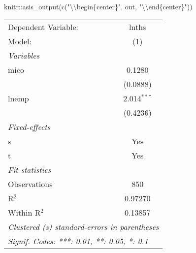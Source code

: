 \documentclass[
]{article}
\newenvironment{Shaded}{\begin{snugshade}}{\end{snugshade}}
\newcommand{\FunctionTok}[1]{\textcolor[rgb]{0.00,0.00,0.00}{#1}}
\newcommand{\NormalTok}[1]{#1}
\newcommand{\SpecialCharTok}[1]{\textcolor[rgb]{0.00,0.00,0.00}{#1}}
\newcommand{\StringTok}[1]{\textcolor[rgb]{0.31,0.60,0.02}{#1}}
\begin{document}
\begin{Shaded}
\begin{Highlighting}[]
\NormalTok{knitr}\SpecialCharTok{::}\FunctionTok{asis\_output}\NormalTok{(}\FunctionTok{c}\NormalTok{(}\StringTok{"}\SpecialCharTok{\textbackslash{}\textbackslash{}}\StringTok{begin\{center\}"}\NormalTok{, out, }\StringTok{"}\SpecialCharTok{\textbackslash{}\textbackslash{}}\StringTok{end\{center\}"}\NormalTok{)) }
\end{Highlighting}
\end{Shaded}

\begin{center}\begin{tabular}{lc}   \tabularnewline\midrule\midrule   Dependent Variable: & lnths\\   Model:              & (1)\\   \midrule \emph{Variables} &  \\   mico                & 0.1280\\                       & (0.0888)\\   lnemp               & 2.014$^{***}$\\                       & (0.4236)\\   \midrule \emph{Fixed-effects} &  \\   s                   & Yes\\   t                   & Yes\\   \midrule \emph{Fit statistics} &  \\   Observations        & 850\\   R$^2$               & 0.97270\\   Within R$^2$        & 0.13857\\   \midrule\midrule\multicolumn{2}{l}{\emph{Clustered (s) standard-errors in parentheses}}\\   \multicolumn{2}{l}{\emph{Signif. Codes: ***: 0.01, **: 0.05, *: 0.1}}\\\end{tabular}\end{center}
\end{document}
